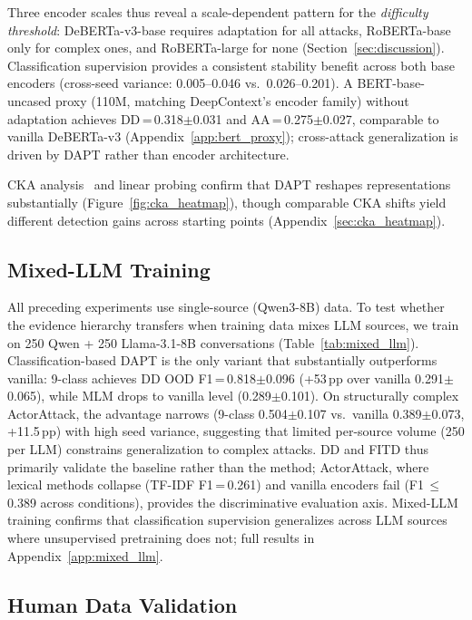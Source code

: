 Three encoder scales thus reveal a scale-dependent pattern for the \emph{difficulty threshold}: DeBERTa-v3-base requires adaptation for all attacks, RoBERTa-base only for complex ones, and RoBERTa-large for none (Section~\ref{sec:discussion}).
Classification supervision provides a consistent stability benefit across both base encoders (cross-seed variance: 0.005--0.046 vs.\ 0.026--0.201).
A BERT-base-uncased proxy (110M, matching DeepContext's encoder family) without adaptation achieves DD\,=\,0.318$\pm$0.031 and AA\,=\,0.275$\pm$0.027, comparable to vanilla DeBERTa-v3 (Appendix~\ref{app:bert_proxy}); cross-attack generalization is driven by DAPT rather than encoder architecture.

CKA analysis~\citep{kornblith2019cka} and linear probing confirm that DAPT reshapes representations substantially (Figure~\ref{fig:cka_heatmap}), though comparable CKA shifts yield different detection gains across starting points (Appendix~\ref{sec:cka_heatmap}).

\subsection{Mixed-LLM Training}

All preceding experiments use single-source (Qwen3-8B) data. To test whether the evidence hierarchy transfers when training data mixes LLM sources, we train on 250 Qwen + 250 Llama-3.1-8B conversations (Table~\ref{tab:mixed_llm}).
Classification-based DAPT is the only variant that substantially outperforms vanilla: 9-class achieves DD OOD F1\,=\,0.818$\pm$0.096 (+53\,pp over vanilla 0.291$\pm$0.065), while MLM drops to vanilla level (0.289$\pm$0.101). On structurally complex ActorAttack, the advantage narrows (9-class 0.504$\pm$0.107 vs.\ vanilla 0.389$\pm$0.073, +11.5\,pp) with high seed variance, suggesting that limited per-source volume (250 per LLM) constrains generalization to complex attacks. DD and FITD thus primarily validate the baseline rather than the method; ActorAttack, where lexical methods collapse (TF-IDF F1\,=\,0.261) and vanilla encoders fail (F1\,$\leq$\,0.389 across conditions), provides the discriminative evaluation axis.
Mixed-LLM training confirms that classification supervision generalizes across LLM sources where unsupervised pretraining does not; full results in Appendix~\ref{app:mixed_llm}.

\subsection{Human Data Validation}
\label{sec:human_data}

